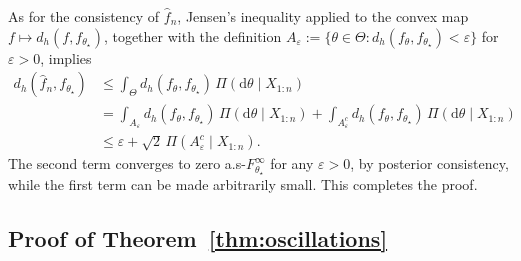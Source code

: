 \documentclass[11pt,twoside]{article}
\begin{document}
As for the consistency of $\hat f_n$, Jensen's inequality applied to the convex map $f \mapsto d_h(f, f_{\theta_\star})$, together with the definition $A_\varepsilon := \{\theta \in \Theta : d_h(f_\theta, f_{\theta_\star}) < \varepsilon\}$ for $\varepsilon > 0$, implies
%
\begin{align*}
    d_h(\hat f_n, f_{\theta_\star}) & \leq \int_\Theta d_h(f_\theta, f_{\theta_\star})\,\Pi(\mathrm d\theta \mid X_{1:n}) \\
    & = \int_{A_\varepsilon} d_h(f_\theta, f_{\theta_\star})\,\Pi(\mathrm d\theta \mid X_{1:n}) + \int_{A_\varepsilon^c} d_h(f_\theta, f_{\theta_\star})\,\Pi(\mathrm d\theta \mid X_{1:n}) \\
    & \leq \varepsilon + \sqrt{2}\, \Pi(A_\varepsilon^c \mid X_{1:n}).
\end{align*}
%
The second term converges to zero a.s-$F_{\theta_\star}^\infty$ for any $\varepsilon > 0$, by posterior consistency, while the first term can be made arbitrarily small. This completes the proof.




\subsection*{Proof of Theorem~\ref{thm:oscillations}} %
\end{document}

